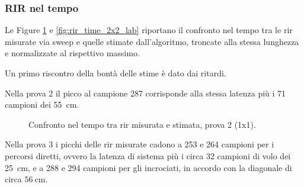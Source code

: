 \documentclass[11pt,a4paper]{article}
\begin{document}
	\subsubsection{RIR nel tempo}
	Le Figure \ref{fig:rir_time_1x1_lab} e \ref{fig:rir_time_2x2_lab} riportano il confronto nel tempo tra le \ac{rir} misurate via sweep e quelle stimate dall'algoritmo, troncate alla stessa lunghezza e normalizzate al rispettivo massimo.

	Un primo riscontro della bontà delle stime è dato dai ritardi. 
	
	Nella prova 2 il picco al campione 287 corrisponde alla stessa latenza più i 71 campioni dei \SI{55}{\centi\meter}. 

	\begin{figure}[H]
		\centering
		\caption{Confronto nel tempo tra \ac{rir} misurata e stimata, prova 2 (1x1).}
		\label{fig:rir_time_1x1_lab}
	\end{figure}

	Nella prova 3 i picchi delle \ac{rir} misurate cadono a 253 e 264 campioni per i percorsi diretti, ovvero la latenza di sistema più i circa 32 campioni di volo dei \SI{25}{\centi\meter}, e a 288 e 294 campioni per gli incrociati, in accordo con la diagonale di circa $\SI{56}{\centi\meter}$.
\end{document}
